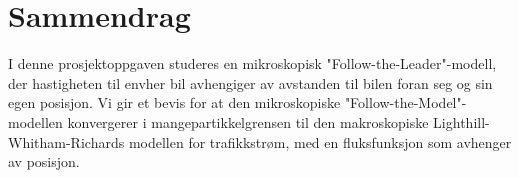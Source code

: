 \chapter*{Sammendrag}

I denne prosjektoppgaven studeres en mikroskopisk "Follow-the-Leader"-modell, der hastigheten til envher bil avhengiger av avstanden til bilen foran seg og sin egen posisjon. Vi gir et bevis for at den mikroskopiske "Follow-the-Model"-modellen konvergerer i mangepartikkelgrensen til den makroskopiske  Lighthill-Whitham-Richards modellen for trafikkstrøm, med en fluksfunksjon som avhenger av posisjon. 




\iffalse
Dokumentklassen \texttt{ntnuthesis} er en tilpasset versjon av \LaTeX' standard \texttt{report}-klasse. Den er tilrettelagt for avhandlinger på alle nivåer – bachelor, master og PhD – og er tilgjengelig på både norsk (bokmål og nynorsk) og engelsk (britisk og amerikansk). Dette dokumentet er ment å tjene (i) som en beskrivelse av dokument\-klassen, (ii) som et eksempel på bruken av den, og (iii) som en mal for avhandlingen.
\fi